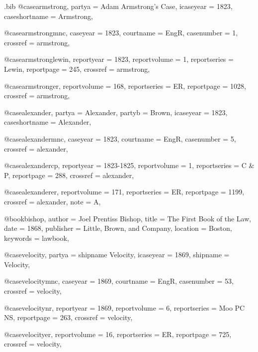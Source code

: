 \begin{filecontents*}[overwrite]{\jobname.bib}
@case{armstrong,
  partya = {Adam Armstrong's Case},
  icaseyear = {1823},
  caseshortname = {Armstrong},
	}

@case{armstrongmnc,
  caseyear = {1823},
  courtname = {EngR},
  casenumber = {1},
  crossref = {armstrong},
}


@case{armstronglewin,
  reportyear = {1823},
  reportvolume = {1},
  reportseries = {Lewin},
  reportpage = {245},
  crossref = {armstrong},
}

@case{armstronger,
  reportvolume = {168},
  reportseries = {ER},
  reportpage = {1028},
  crossref = {armstrong},
}




@case{alexander,
  partya = {Alexander},
  partyb = {Brown},
  icaseyear = {1823},
  caseshortname = {Alexander},
	}

@case{alexandermnc,
  caseyear = {1823},
  courtname = {EngR},
  casenumber = {5},
  crossref = {alexander},
}


@case{alexandercp,
  reportyear = {1823-1825},
  reportvolume = {1},
  reportseries = {C \& P},
  reportpage = {288},
  crossref = {alexander},
}

@case{alexanderer,
  reportvolume = {171},
  reportseries = {ER},
  reportpage = {1199},
  crossref = {alexander},
  note = {A},
}




@book{bishop,
author = {Joel Prentiss Bishop},
title = {The First Book of the Law},
date = {1868},
publisher = {Little, Brown, and Company},
location = {Boston},
keywords = {lawbook},
}


@case{velocity,
  partya = {shipname Velocity},
  icaseyear = {1869},
  shipname = {Velocity},
	}

@case{velocitymnc,
  caseyear = {1869},
  courtname = {EngR},
  casenumber = {53},
  crossref = {velocity},
}


@case{velocitynr,
  reportyear = {1869},
  reportvolume = {6},
  reportseries = {Moo PC NS},
  reportpage = {263},
  crossref = {velocity},
}

@case{velocityer,
  reportvolume = {16},
  reportseries = {ER},
  reportpage = {725},
  crossref = {velocity},
}






\end{filecontents*}
